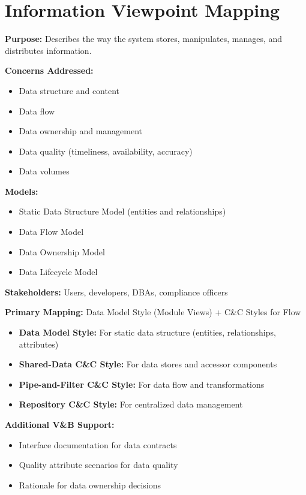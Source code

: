 \documentclass[11pt]{article}
\begin{document}
\section{Information Viewpoint Mapping}

\begin{rwbox}
\textbf{Purpose:} Describes the way the system stores, manipulates, manages, and distributes information.

\textbf{Concerns Addressed:}
\begin{itemize}[nosep]
    \item Data structure and content
    \item Data flow
    \item Data ownership and management
    \item Data quality (timeliness, availability, accuracy)
    \item Data volumes
\end{itemize}

\textbf{Models:}
\begin{itemize}[nosep]
    \item Static Data Structure Model (entities and relationships)
    \item Data Flow Model
    \item Data Ownership Model
    \item Data Lifecycle Model
\end{itemize}

\textbf{Stakeholders:} Users, developers, DBAs, compliance officers
\end{rwbox}

\begin{vbbox}
\textbf{Primary Mapping:} Data Model Style (Module Views) + C\&C Styles for Flow

\begin{itemize}
    \item \textbf{Data Model Style:} For static data structure (entities, relationships, attributes)
    \item \textbf{Shared-Data C\&C Style:} For data stores and accessor components
    \item \textbf{Pipe-and-Filter C\&C Style:} For data flow and transformations
    \item \textbf{Repository C\&C Style:} For centralized data management
\end{itemize}

\textbf{Additional V\&B Support:}
\begin{itemize}
    \item Interface documentation for data contracts
    \item Quality attribute scenarios for data quality
    \item Rationale for data ownership decisions
\end{itemize}
\end{vbbox}
\end{document}
